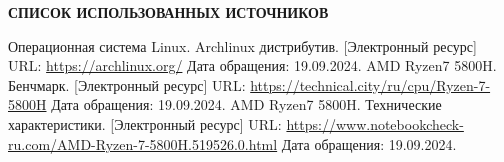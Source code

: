 \renewcommand{\bibname}{}
\begin{thebibliography}{6}
\renewcommand{\bibname}{СПИСОК ИСПОЛЬЗОВАННЫХ ИСТОЧНИКОВ}
\begin{center}
    \textbf{\bibname}
\end{center}
    Операционная система Linux. Archlinux дистрибутив. [Электронный ресурс]
    URL: \url{https://archlinux.org/}
    Дата обращения: 19.09.2024.
    AMD Ryzen7 5800H. Бенчмарк. [Электронный ресурс]
    URL: \url{https://technical.city/ru/cpu/Ryzen-7-5800H}
    Дата обращения: 19.09.2024.
    AMD Ryzen7 5800H. Технические характеристики. [Электронный ресурс]
    URL: \url{https://www.notebookcheck-ru.com/AMD-Ryzen-7-5800H.519526.0.html}
    Дата обращения: 19.09.2024.
\end{thebibliography}
